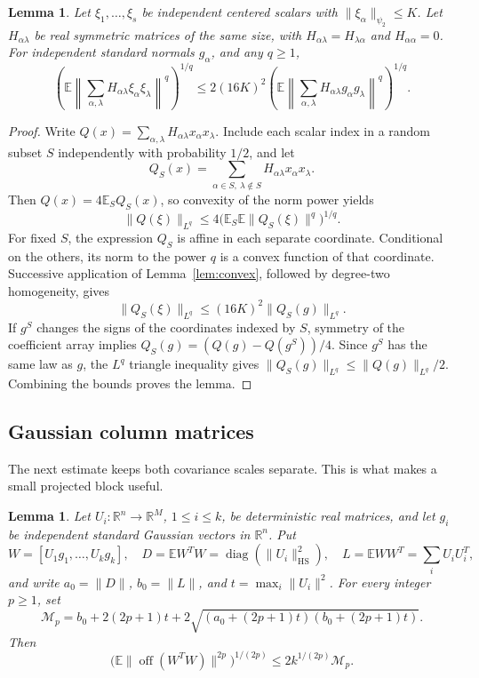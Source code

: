 \documentclass[11pt]{article}
\newtheorem{lemma}[theorem]{Lemma}
\newcommand{\R}{\mathbb R}
\newcommand{\E}{\mathbb E}
\newcommand{\HS}{\mathrm{HS}}
\newcommand{\off}{\operatorname{off}}
\newcommand{\diag}{\operatorname{diag}}
\begin{document}
\begin{lemma}\label{lem:quadratic}
Let \(\xi_1,\ldots,\xi_s\) be independent centered scalars with
\(\|\xi_\alpha\|_{\psi_2}\le K\). Let \(H_{\alpha\lambda}\)
be real symmetric matrices of the same size, with
\(H_{\alpha\lambda}=H_{\lambda\alpha}\) and \(H_{\alpha\alpha}=0\).
For independent standard normals \(g_\alpha\), and any \(q\ge1\),
\[
 \left(\E\left\|\sum_{\alpha,\lambda}
 H_{\alpha\lambda}\xi_\alpha\xi_\lambda\right\|^q\right)^{1/q}
 \le2(16K)^2
 \left(\E\left\|\sum_{\alpha,\lambda}
 H_{\alpha\lambda}g_\alpha g_\lambda\right\|^q\right)^{1/q}.
\]
\end{lemma}

\begin{proof}
Write \(Q(x)=\sum_{\alpha,\lambda}H_{\alpha\lambda}
x_\alpha x_\lambda\). Include each scalar index in a random subset
\(S\) independently with probability \(1/2\), and let
\[
 Q_S(x)=\sum_{\alpha\in S,\ \lambda\notin S}
 H_{\alpha\lambda}x_\alpha x_\lambda.
\]
Then \(Q(x)=4\E_SQ_S(x)\), so convexity of the norm power yields
\[
 \|Q(\xi)\|_{L^q}
 \le4\big(\E_S\E\|Q_S(\xi)\|^q\big)^{1/q}.
\]
For fixed \(S\), the expression \(Q_S\) is affine in each separate
coordinate. Conditional on the others, its norm to the power \(q\)
is a convex function of that coordinate. Successive application of
Lemma~\ref{lem:convex}, followed by degree-two homogeneity, gives
\[
 \|Q_S(\xi)\|_{L^q}\le(16K)^2\|Q_S(g)\|_{L^q}.
\]
If \(g^S\) changes the signs of the coordinates indexed by \(S\),
symmetry of the coefficient array implies
\(Q_S(g)=(Q(g)-Q(g^S))/4\).
Since \(g^S\) has the same law as \(g\), the \(L^q\) triangle
inequality gives
\(\|Q_S(g)\|_{L^q}\le\|Q(g)\|_{L^q}/2\).
Combining the bounds proves the lemma.
\end{proof}

\subsection{Gaussian column matrices}

The next estimate keeps both covariance scales separate. This is what
makes a small projected block useful.

\begin{lemma}\label{lem:gaussian}
Let \(U_i:\R^n\to\R^M\), \(1\le i\le k\), be deterministic real
matrices, and let \(g_i\) be independent standard Gaussian vectors in
\(\R^n\). Put
\[
 W=[U_1g_1,\ldots,U_kg_k],\quad
 D=\E W^TW=\diag(\|U_i\|_{\HS}^2),\quad
 L=\E WW^T=\sum_iU_iU_i^T,
\]
and write \(a_0=\|D\|\), \(b_0=\|L\|\), and
\(t=\max_i\|U_i\|^2\).
For every integer \(p\ge1\), set
\[
 \mathcal M_p=b_0+2(2p+1)t
       +2\sqrt{(a_0+(2p+1)t)(b_0+(2p+1)t)}.
\]
Then
\begin{equation}\label{eq:gaussian-moment}
 \big(\E\|\off(W^TW)\|^{2p}\big)^{1/(2p)}
 \le2k^{1/(2p)}\mathcal M_p.
\end{equation}
\end{lemma}
\end{document}
